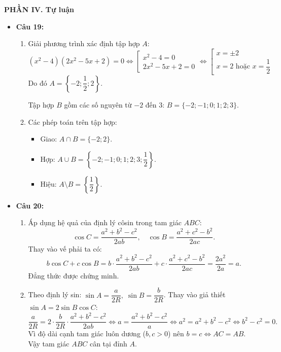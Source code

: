 \documentclass[12pt,a4paper]{article}
\begin{document}
\vspace{0.15cm}
\textbf{\large PHẦN IV. Tự luận}
\begin{itemize}[leftmargin=0.6cm, itemsep=4pt, topsep=1pt]
\item \textbf{Câu 19:}
\begin{enumerate}[label=\alph*), itemsep=2pt, topsep=1pt]
    \item Giải phương trình xác định tập hợp $A$:
    \[
    (x^2 - 4)(2x^2 - 5x + 2) = 0 \iff \left[\begin{array}{l} x^2 - 4 = 0 \\ 2x^2 - 5x + 2 = 0 \end{array}\right. \iff \left[\begin{array}{l} x = \pm 2 \\ x = 2 \text{ hoặc } x = \dfrac{1}{2} \end{array}\right.
    \]
    Do đó $A = \left\{-2; \dfrac{1}{2}; 2\right\}$.
    
    Tập hợp $B$ gồm các số nguyên từ $-2$ đến $3$: $B = \{-2; -1; 0; 1; 2; 3\}$.
    \item Các phép toán trên tập hợp:
    \begin{itemize}[itemsep=1pt]
        \item Giao: $A \cap B = \{-2; 2\}$.
        \item Hợp: $A \cup B = \left\{-2; -1; 0; 1; 2; 3; \dfrac{1}{2}\right\}$.
        \item Hiệu: $A \setminus B = \left\{\dfrac{1}{2}\right\}$.
    \end{itemize}
\end{enumerate}

\enlargethispage{2.5\baselineskip}
\item \textbf{Câu 20:}
\begin{enumerate}[label=\alph*), itemsep=2pt, topsep=1pt]
    \item Áp dụng hệ quả của định lý côsin trong tam giác $ABC$:
    \[
    \cos C = \dfrac{a^2 + b^2 - c^2}{2ab},\quad \cos B = \dfrac{a^2 + c^2 - b^2}{2ac}.
    \]
    Thay vào vế phải ta có:
    \[
    b \cos C + c \cos B = b \cdot \dfrac{a^2 + b^2 - c^2}{2ab} + c \cdot \dfrac{a^2 + c^2 - b^2}{2ac} = \dfrac{2a^2}{2a} = a.
    \]
    Đẳng thức được chứng minh.
    \item Theo định lý sin: $\sin A = \dfrac{a}{2R},\; \sin B = \dfrac{b}{2R}$. Thay vào giả thiết $\sin A = 2\sin B \cos C$:
    \[
    \dfrac{a}{2R} = 2 \cdot \dfrac{b}{2R} \cdot \dfrac{a^2 + b^2 - c^2}{2ab} \iff a = \dfrac{a^2 + b^2 - c^2}{a} \iff a^2 = a^2 + b^2 - c^2 \iff b^2 - c^2 = 0.
    \]
    Vì độ dài cạnh tam giác luôn dương ($b, c > 0$) nên $b = c \iff AC = AB$. Vậy tam giác $ABC$ cân tại đỉnh $A$.
\end{enumerate}


\end{itemize}
\end{document}
